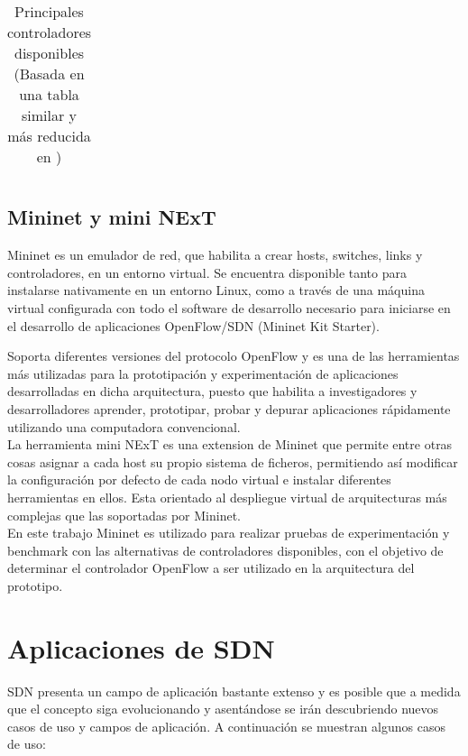 \begin{table}[htbp!]
\begin{tabular}{|l|l|l|p{2cm}|l|p{5cm}|}
\hline   
\end{tabular}
\caption[Principales controladores disponibles]{Principales controladores disponibles (Basada en una tabla similar y más reducida en \cite{StateOfArt1})}
\label{table:Controladores}
\end{table}

\newpage
\subsection{Mininet y mini NExT}
Mininet\cite{Mininet1} es un emulador de red, que habilita a crear hosts, switches, links y controladores, en un entorno virtual. Se encuentra disponible tanto para instalarse nativamente en un entorno Linux, como a través de una m\'aquina virtual configurada con todo el software de desarrollo necesario para iniciarse en el desarrollo de aplicaciones OpenFlow/SDN (Mininet Kit Starter). 

Soporta diferentes versiones del protocolo OpenFlow y es una de las herramientas m\'as utilizadas para la prototipaci\'on y experimentación de aplicaciones desarrolladas en dicha arquitectura, puesto que habilita a investigadores y desarrolladores aprender, prototipar, probar y depurar aplicaciones rápidamente utilizando una computadora convencional.\\

La herramienta mini NExT es una extension de Mininet que permite entre otras cosas asignar a cada host su propio sistema de ficheros, permitiendo as\'i modificar la configuraci\'on por defecto de cada nodo virtual e instalar diferentes herramientas en ellos. Esta orientado al despliegue virtual de arquitecturas m\'as complejas que las soportadas por Mininet.\\   

En este trabajo Mininet es utilizado para realizar pruebas de experimentaci\'on y benchmark con las alternativas de controladores disponibles, con el objetivo de determinar el controlador OpenFlow a ser utilizado en la arquitectura del prototipo.\\

\section{Aplicaciones de SDN}
SDN presenta un campo de aplicación bastante extenso y es posible que a medida que el concepto siga evolucionando y asentándose se irán descubriendo nuevos casos de uso y campos de aplicación. A continuación se muestran algunos casos de uso:

